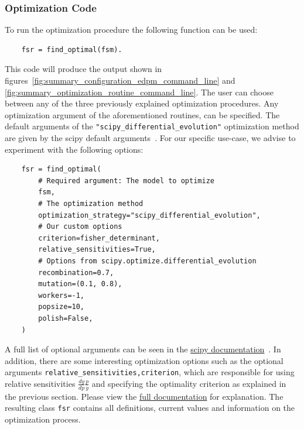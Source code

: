 \documentclass[graybox]{svmult}
\begin{document}
\subsubsection*{Optimization Code}
To run the optimization procedure the following function can be used:
\begin{verbatim}
    fsr = find_optimal(fsm).
\end{verbatim}
This code will produce the output shown in figures~\ref{fig:summary_configuration_edpm_command_line} and \ref{fig:summary_optimization_routine_command_line}.
The user can choose between any of the three previously explained optimization procedures.
Any optimization argument of the aforementioned routines, can be specified.
The default arguments of the \texttt{"scipy_differential_evolution"} optimization method are given by the scipy default arguments~\cite{scipydiffev}.
For our specific use-case, we advise to experiment with the following options:
\begin{verbatim}
    fsr = find_optimal(
        # Required argument: The model to optimize
        fsm,
        # The optimization method
        optimization_strategy="scipy_differential_evolution",
        # Our custom options
        criterion=fisher_determinant,
        relative_sensitivities=True,
        # Options from scipy.optimize.differential_evolution
        recombination=0.7,
        mutation=(0.1, 0.8),
        workers=-1,
        popsize=10,
        polish=False,
    )
\end{verbatim}
A full list of optional arguments can be seen in the \href{https://docs.scipy.org/doc/scipy/reference/optimize.html#global-optimization}{scipy documentation}~\cite{virtanenSciPyFundamentalAlgorithms2020}.
In addition, there are some interesting optimization options such as the optional arguments \texttt{relative_sensitivities,criterion}, which are responsible for using relative sensitivities $\tfrac{dy}{dp}\tfrac{p}{y}$ and specifying the optimality criterion as explained in the previous section.
Please view the \href{https://spatial-systems-biology-freiburg.github.io/FisInMa/}{full documentation} for explanation.
The resulting class \texttt{fsr} contains all definitions, current values and information on the optimization process.
%
\end{document}
